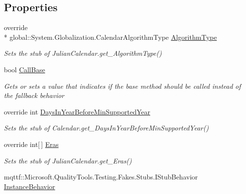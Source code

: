 \subsection*{Properties}
\begin{DoxyCompactItemize}
\item 
override \\*
global\-::\-System.\-Globalization.\-Calendar\-Algorithm\-Type \hyperlink{class_system_1_1_globalization_1_1_fakes_1_1_stub_julian_calendar_a16e2a4d3f5eedc15a34b6cd6d1697f33}{Algorithm\-Type}
\begin{DoxyCompactList}\small\item\em Sets the stub of Julian\-Calendar.\-get\-\_\-\-Algorithm\-Type()\end{DoxyCompactList}\item 
bool \hyperlink{class_system_1_1_globalization_1_1_fakes_1_1_stub_julian_calendar_a2a2b6d291f9a9aaf47837d82f29d5402}{Call\-Base}
\begin{DoxyCompactList}\small\item\em Gets or sets a value that indicates if the base method should be called instead of the fallback behavior\end{DoxyCompactList}\item 
override int \hyperlink{class_system_1_1_globalization_1_1_fakes_1_1_stub_julian_calendar_a58a7e2856915a0f99088ab63e80aa66e}{Days\-In\-Year\-Before\-Min\-Supported\-Year}
\begin{DoxyCompactList}\small\item\em Sets the stub of Calendar.\-get\-\_\-\-Days\-In\-Year\-Before\-Min\-Supported\-Year()\end{DoxyCompactList}\item 
override int\mbox{[}$\,$\mbox{]} \hyperlink{class_system_1_1_globalization_1_1_fakes_1_1_stub_julian_calendar_a349b30c23c68e11bb4d01c0aa407b66f}{Eras}
\begin{DoxyCompactList}\small\item\em Sets the stub of Julian\-Calendar.\-get\-\_\-\-Eras()\end{DoxyCompactList}\item 
mqttf\-::\-Microsoft.\-Quality\-Tools.\-Testing.\-Fakes.\-Stubs.\-I\-Stub\-Behavior \hyperlink{class_system_1_1_globalization_1_1_fakes_1_1_stub_julian_calendar_a59ee3d27d8c5b5a85aa22ac427aad413}{Instance\-Behavior}

\end{DoxyCompactItemize}

